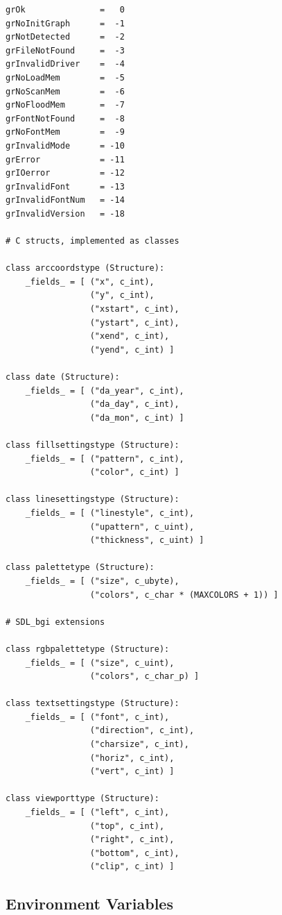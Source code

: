 \documentclass[a4paper,12pt]{article}
\begin{document}
\begin{footnotesize}
\begin{spacing}{0.8}
\begin{verbatim}
grOk               =   0
grNoInitGraph      =  -1
grNotDetected      =  -2
grFileNotFound     =  -3
grInvalidDriver    =  -4
grNoLoadMem        =  -5
grNoScanMem        =  -6
grNoFloodMem       =  -7
grFontNotFound     =  -8
grNoFontMem        =  -9
grInvalidMode      = -10
grError            = -11
grIOerror          = -12
grInvalidFont      = -13
grInvalidFontNum   = -14
grInvalidVersion   = -18

# C structs, implemented as classes

class arccoordstype (Structure):
    _fields_ = [ ("x", c_int),
                 ("y", c_int),
                 ("xstart", c_int),
                 ("ystart", c_int),
                 ("xend", c_int),
                 ("yend", c_int) ]

class date (Structure):
    _fields_ = [ ("da_year", c_int),
                 ("da_day", c_int),
                 ("da_mon", c_int) ]

class fillsettingstype (Structure):
    _fields_ = [ ("pattern", c_int),
                 ("color", c_int) ]

class linesettingstype (Structure):
    _fields_ = [ ("linestyle", c_int),
                 ("upattern", c_uint),
                 ("thickness", c_uint) ]

class palettetype (Structure):
    _fields_ = [ ("size", c_ubyte),
                 ("colors", c_char * (MAXCOLORS + 1)) ]

# SDL_bgi extensions

class rgbpalettetype (Structure):
    _fields_ = [ ("size", c_uint),
                 ("colors", c_char_p) ]

class textsettingstype (Structure):
    _fields_ = [ ("font", c_int),
                 ("direction", c_int),
                 ("charsize", c_int),
                 ("horiz", c_int),
                 ("vert", c_int) ]

class viewporttype (Structure):
    _fields_ = [ ("left", c_int),
                 ("top", c_int),
                 ("right", c_int),
                 ("bottom", c_int),
                 ("clip", c_int) ]
\end{verbatim}
\end{spacing}
\end{footnotesize}


\subsection{Environment Variables}
\end{document}
